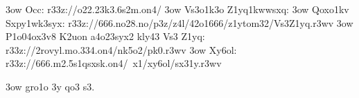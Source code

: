   \s3ow Occ: r33z://o22.23k3.6s2m.on4/
  \s3ow Vs3o1k3o Z1yq1kwwsxq:
    \s3ow Qoxo1kv Sxpy1wk3syx:
      r33z://666.no28.no/p3z/z4l/42o1666/z1ytom32/Vs3Z1yq.r3wv 
    \s3ow %
      P1o04ox3v8 K2uon a4o23syx2 kly43 Vs3 Z1yq: r33z://2rovyl.mo.334.on4/nk5o2/pk0.r3wv
    \s3ow %
      Xy6ol: r33z://666.m2.5s1qsxsk.on4/~x1/xy6ol/sx31y.r3wv

\s3ow gro1o 3y qo3 s3.

